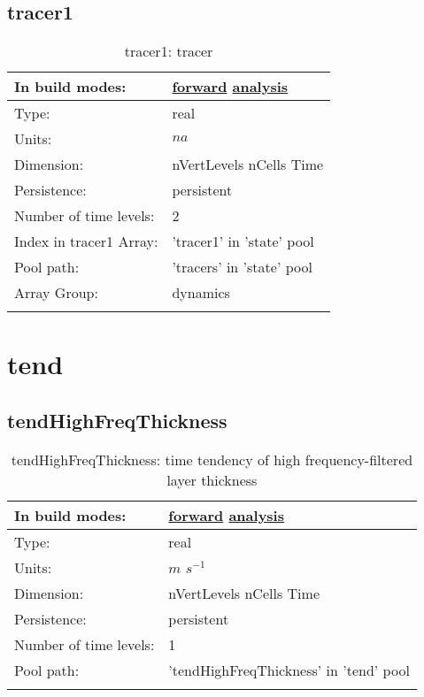 \subsection[tracer1]{tracer1}
\label{subsec:var_sec_state_tracer1}
\begin{center}
\begin{longtable}{| p{2.0in} | p{4.0in} |}
        \hline 
        In build modes: & \hyperref[subsec:forward_var_tab_state]{forward} \hyperref[subsec:analysis_var_tab_state]{analysis} \\
        \hline 
        Type: & real \\
        \hline 
        Units: & $na$ \\
        \hline 
        Dimension: & nVertLevels nCells Time \\
        \hline 
        Persistence: & persistent \\
        \hline 
        Number of time levels: & 2 \\
        \hline 
		 Index in tracer1 Array: & 'tracer1' in 'state' pool \\
		 \hline 
            Pool path: & 'tracers' in 'state' pool
 \\
		 \hline 
		 Array Group: & dynamics \\
		 \hline 
    \caption{tracer1: tracer}
\end{longtable}
\end{center}
\section[tend]{tend}
\label{sec:var_sec_tend}
\subsection[tendHighFreqThickness]{tendHighFreqThickness}
\label{subsec:var_sec_tend_tendHighFreqThickness}
\begin{center}
\begin{longtable}{| p{2.0in} | p{4.0in} |}
        \hline 
        In build modes: & \hyperref[subsec:forward_var_tab_tend]{forward} \hyperref[subsec:analysis_var_tab_tend]{analysis} \\
        \hline 
        Type: & real \\
        \hline 
        Units: & $m$ $s^{-1}$ \\
        \hline 
        Dimension: & nVertLevels nCells Time \\
        \hline 
        Persistence: & persistent \\
        \hline 
        Number of time levels: & 1 \\
        \hline 
            Pool path: & 'tendHighFreqThickness' in 'tend' pool
 \\
		 \hline 
    \caption{tendHighFreqThickness: time tendency of high frequency-filtered layer thickness}
\end{longtable}
\end{center}
